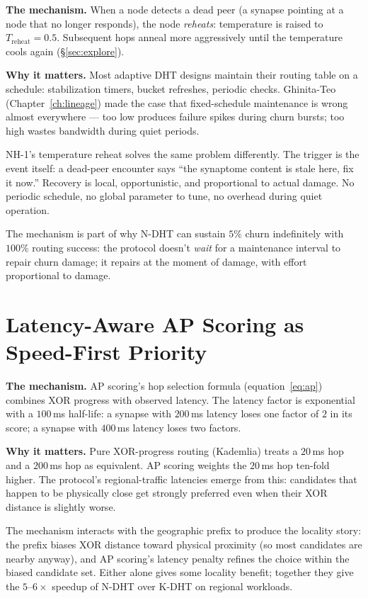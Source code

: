 \documentclass[twoside,nobib]{tufte-book}
\newcommand{\NDHT}{N-DHT\xspace}
\newcommand{\KDHT}{K-DHT\xspace}
\begin{document}
\textbf{The mechanism.} When a node detects a dead peer (a
synapse pointing at a node that no longer responds), the node
\emph{reheats}: temperature is raised to
$T_{\mathrm{reheat}} = 0.5$. Subsequent hops anneal more
aggressively until the temperature cools again
(\S\ref{sec:explore}).

\textbf{Why it matters.} Most adaptive DHT designs maintain
their routing table on a schedule: stabilization timers, bucket
refreshes, periodic checks. Ghinita-Teo
(Chapter~\ref{ch:lineage}) made the case that fixed-schedule
maintenance is wrong almost everywhere --- too low produces
failure spikes during churn bursts; too high wastes bandwidth
during quiet periods.

NH-1's temperature reheat solves the same problem differently.
The trigger is the event itself: a dead-peer encounter says
``the synaptome content is stale here, fix it now.'' Recovery
is local, opportunistic, and proportional to actual damage. No
periodic schedule, no global parameter to tune, no overhead
during quiet operation.

The mechanism is part of why \NDHT can sustain $5\%$ churn
indefinitely with $100\%$ routing success: the protocol doesn't
\emph{wait} for a maintenance interval to repair churn damage;
it repairs at the moment of damage, with effort proportional to
damage.

\section{Latency-Aware AP Scoring as Speed-First Priority}

\textbf{The mechanism.} AP scoring's hop selection formula
(equation~\ref{eq:ap}) combines XOR progress with observed
latency. The latency factor is exponential with a $100$\,ms
half-life: a synapse with $200$\,ms latency loses one factor
of $2$ in its score; a synapse with $400$\,ms latency loses
two factors.

\textbf{Why it matters.} Pure XOR-progress routing (Kademlia)
treats a $20$\,ms hop and a $200$\,ms hop as equivalent. AP
scoring weights the $20$\,ms hop ten-fold higher. The
protocol's regional-traffic latencies emerge from this:
candidates that happen to be physically close get strongly
preferred even when their XOR distance is slightly worse.

The mechanism interacts with the geographic prefix to produce
the locality story: the prefix biases XOR distance toward
physical proximity (so most candidates are nearby anyway), and
AP scoring's latency penalty refines the choice within the
biased candidate set. Either alone gives some locality
benefit; together they give the $5$--$6\times$ speedup of
\NDHT over \KDHT on regional workloads.
\end{document}
